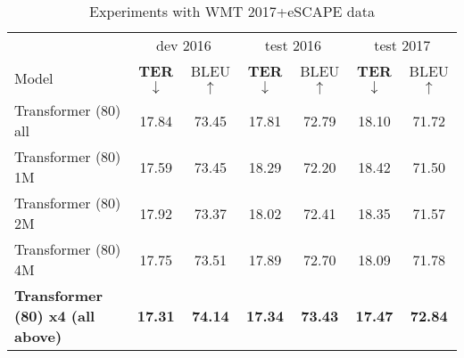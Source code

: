 \documentclass{article}
\begin{document}
\begin{table*}[t]
\centering
\begin{tabular}{p{5.5cm}cccccc}
\toprule
& \multicolumn{2}{c}{dev 2016} & \multicolumn{2}{c}{test 2016} & \multicolumn{2}{c}{test 2017}\\
Model & \textbf{TER$\downarrow$} & BLEU$\uparrow$ & \textbf{TER$\downarrow$} & BLEU$\uparrow$ & \textbf{TER$\downarrow$} & BLEU$\uparrow$ \\
\midrule
Transformer (80) all & 17.84 & 73.45 & 17.81 & 72.79 & 18.10 & 71.72 \\ 
Transformer (80) 1M & 17.59 & 73.45 & 18.29 & 72.20 & 18.42 & 71.50 \\ 
Transformer (80) 2M & 17.92 & 73.37 & 18.02 & 72.41 & 18.35 & 71.57\\ 
Transformer (80) 4M & 17.75 & 73.51 & 17.89 & 72.70 & 18.09 & 71.78 \\ \midrule
\bf Transformer (80) x4 (all above) & \bf 17.31 & \bf 74.14 & \bf 17.34 & \bf 73.43 & \bf 17.47 & \bf 72.84 \\ 



\bottomrule
\end{tabular}
\caption{Experiments with WMT 2017+eSCAPE data}\label{tab:results}
\end{table*}

\end{document}
